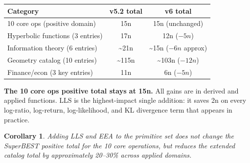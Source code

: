 \documentclass[11pt]{article}
\newtheorem{corollary}[theorem]{Corollary}
\begin{document}
\begin{center}
\begin{tabular}{lcc}
\toprule
Category & v5.2 total & v6 total \\
\midrule
10 core ops (positive domain) & 15n & 15n (unchanged) \\
Hyperbolic functions (3 entries) & 17n & 12n ($-5n$) \\
Information theory (6 entries) & \textasciitilde21n & \textasciitilde15n ($-6n$ approx) \\
Geometry catalog (10 entries) & \textasciitilde115n & \textasciitilde103n ($-12n$) \\
Finance/econ (3 key entries) & 11n & 6n ($-5n$) \\
\bottomrule
\end{tabular}
\end{center}

\noindent \textbf{The 10 core ops positive total stays at 15n.}
All gains are in derived and applied functions. LLS is the highest-impact
single addition: it saves 2n on every log-ratio, log-return, log-likelihood,
and KL divergence term that appears in practice.

\begin{corollary}
Adding LLS and EEA to the primitive set does not change the SuperBEST
positive total for the 10 core operations, but reduces the
\emph{extended catalog} total by approximately 20--30\% across applied domains.
\end{corollary}
\end{document}
